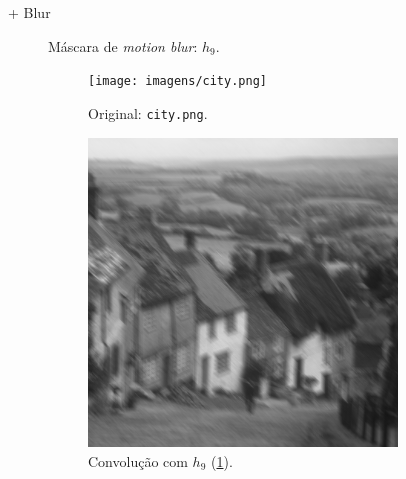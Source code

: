 
+ Blur

\begin{figure}[H]
    \centering
    

    \caption{Máscara de \textit{motion blur}: $h_9$.}
    \label{fig:h9}
\end{figure}

\begin{figure}[H]
    \centering
    \begin{subfigure}{0.48\textwidth}
        \centering
        \texttt{[image: imagens/city.png]}
        \caption{Original: \texttt{city.png}.}
    \end{subfigure}%
    \begin{subfigure}{0.48\textwidth}
        \centering
        \includegraphics[width=0.9\textwidth]{resultados/city_h9.png}
        \caption{Convolução com $h_9$ (\ref{fig:h9}).}
    \end{subfigure}\\[8pt]
    \begin{subfigure}{0.48\textwidth}
        \centering

\end{subfigure}
\end{figure}
